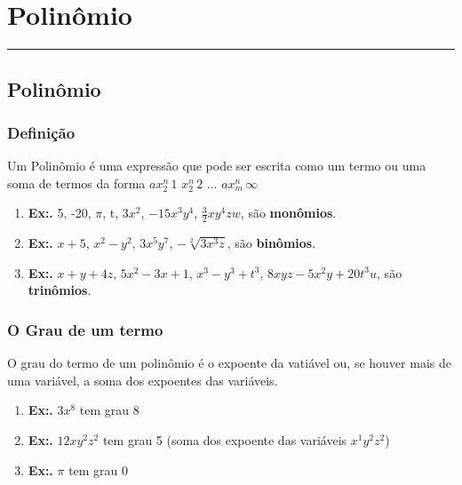 \chapter{Polinômio}
\rule{14cm} {0.03cm}
\begin{flushleft}
  \section{Polinômio}
    \subsection{Definição}
    
      Um Polinômio é uma expressão que pode ser escrita como um termo ou uma soma de termos da forma $ax_{2}^{n} \, 1$ $x_{2}^{n} \, 2$ ... $ax_{m}^{n} \, \infty$   
      \begin{enumerate}
        \item \textbf{Ex:.} 5, -20, $ \pi $, t, $ 3x^2 $, $ -15x^3y^4 $, $ \frac{3}{2}xy^4zw $, são \textbf{monômios}.

        \item\textbf{Ex:.} $ x + 5 $, $ x^2 - y^2 $, $ 3x^5y^7 $, $ - \sqrt[2]{3x^3z} $, são \textbf{binômios}. 
      
        \item\textbf{Ex:.} $ x + y + 4z $, $ 5x^2 - 3x + 1 $, $ x^3 - y^3 + t^3 $, $ 8xyz - 5x^2y + 20t^3u $, são \textbf{trinômios}.  

      \end{enumerate}

    \subsection{O Grau de um termo}

      O grau do termo de um polinômio é o expoente da vatiável ou, se houver mais de uma variável, a soma dos expoentes das variáveis. 

    \begin{enumerate}
      \item \textbf{Ex:.} $ 3x^8 $ tem grau 8 

      \item \textbf{Ex:.} $ 12xy^2z^2 $ tem grau 5 (soma dos expoente das variáveis $ x^1 y^2 z^2 $)

      \item \textbf{Ex:.} $ \pi $ tem grau 0

    \end{enumerate}


\end{flushleft}
